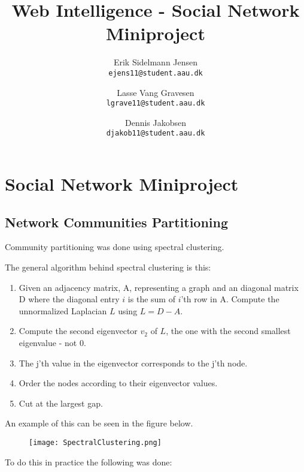 

\author{
  Erik Sidelmann Jensen\\
  \texttt{ejens11@student.aau.dk}
  \and
  Lasse Vang Gravesen\\
  \texttt{lgrave11@student.aau.dk}
  \and
  Dennis Jakobsen\\
  \texttt{djakob11@student.aau.dk}  
}

\title{Web Intelligence - Social Network Miniproject}
\date{}


	\clearpage\maketitle
	\thispagestyle{empty}
	
	\chapter{Social Network Miniproject}
	\section{Network Communities Partitioning}
	Community partitioning was done using spectral clustering.
	
	
	
	The general algorithm behind spectral clustering is this:
	\begin{enumerate}
	\item Given an adjacency matrix, A, representing a graph and an diagonal matrix D where the diagonal entry $i$ is the sum of $i$'th row in A. Compute the unnormalized Laplacian $L$ using $L = D-A$.
	\item Compute the second eigenvector $v_2$ of $L$, the one with the second smallest eigenvalue - not 0.
	\item The j'th value in the eigenvector corresponds to the j'th node.
	\item Order the nodes according to their eigenvector values.
	\item Cut at the largest gap.
	\end{enumerate}
	
	An example of this can be seen in the figure below.
	
	\begin{figure}[H]
	\texttt{[image: SpectralClustering.png]}
	\end{figure}
	
	To do this in practice the following was done:
	
